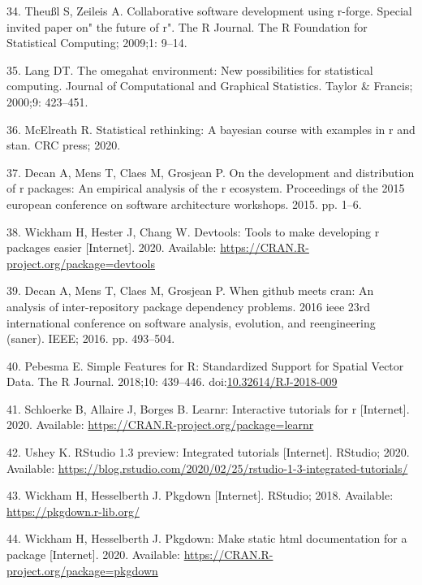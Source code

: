 \documentclass[10pt,letterpaper]{article}
\begin{document}
\leavevmode\hypertarget{ref-theussl2009}{}%
34. Theußl S, Zeileis A. Collaborative software development using
r-forge. Special invited paper on" the future of r". The R Journal. The
R Foundation for Statistical Computing; 2009;1: 9--14.

\leavevmode\hypertarget{ref-lang2000}{}%
35. Lang DT. The omegahat environment: New possibilities for statistical
computing. Journal of Computational and Graphical Statistics. Taylor \&
Francis; 2000;9: 423--451.

\leavevmode\hypertarget{ref-mcelreath2020}{}%
36. McElreath R. Statistical rethinking: A bayesian course with examples
in r and stan. CRC press; 2020.

\leavevmode\hypertarget{ref-decan2015}{}%
37. Decan A, Mens T, Claes M, Grosjean P. On the development and
distribution of r packages: An empirical analysis of the r ecosystem.
Proceedings of the 2015 european conference on software architecture
workshops. 2015. pp. 1--6.

\leavevmode\hypertarget{ref-devtools}{}%
38. Wickham H, Hester J, Chang W. Devtools: Tools to make developing r
packages easier {[}Internet{]}. 2020. Available:
\url{https://CRAN.R-project.org/package=devtools}

\leavevmode\hypertarget{ref-decan2016}{}%
39. Decan A, Mens T, Claes M, Grosjean P. When github meets cran: An
analysis of inter-repository package dependency problems. 2016 ieee 23rd
international conference on software analysis, evolution, and
reengineering (saner). IEEE; 2016. pp. 493--504.

\leavevmode\hypertarget{ref-sf}{}%
40. Pebesma E. Simple Features for R: Standardized Support for Spatial
Vector Data. The R Journal. 2018;10: 439--446.
doi:\href{https://doi.org/10.32614/RJ-2018-009}{10.32614/RJ-2018-009}

\leavevmode\hypertarget{ref-learnr}{}%
41. Schloerke B, Allaire J, Borges B. Learnr: Interactive tutorials for
r {[}Internet{]}. 2020. Available:
\url{https://CRAN.R-project.org/package=learnr}

\leavevmode\hypertarget{ref-ushey2020}{}%
42. Ushey K. RStudio 1.3 preview: Integrated tutorials {[}Internet{]}.
RStudio; 2020. Available:
\url{https://blog.rstudio.com/2020/02/25/rstudio-1-3-integrated-tutorials/}

\leavevmode\hypertarget{ref-pkgdownweb}{}%
43. Wickham H, Hesselberth J. Pkgdown {[}Internet{]}. RStudio; 2018.
Available: \url{https://pkgdown.r-lib.org/}

\leavevmode\hypertarget{ref-pkgdown}{}%
44. Wickham H, Hesselberth J. Pkgdown: Make static html documentation
for a package {[}Internet{]}. 2020. Available:
\url{https://CRAN.R-project.org/package=pkgdown}
\end{document}
